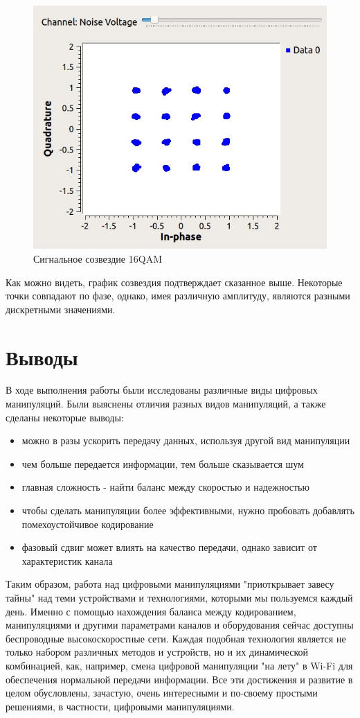 	\begin{figure}[H]
		\begin{center}
			\includegraphics[scale=0.4]{../16qam.jpg}
			\caption{Сигнальное созвездие 16QAM} 
		\end{center}
	\end{figure}
	Как можно видеть, график созвездия подтверждает сказанное выше. Некоторые точки совпадают по фазе, однако, имея различную амплитуду, являются разными дискретными значениями. 
	
	\newpage
	\section{Выводы}
	В ходе выполнения работы были исследованы различные виды цифровых манипуляций. Были выяснены отличия разных видов манипуляций, а также сделаны некоторые выводы:
	\begin{itemize}
		\item можно в разы ускорить передачу данных, используя другой вид манипуляции
		\item чем больше передается информации, тем больше сказывается шум
		\item главная сложность - найти баланс между скоростью и надежностью
		\item чтобы сделать манипуляции более эффективными, нужно пробовать добавлять помехоустойчивое кодирование
		\item фазовый сдвиг может влиять на качество передачи, однако зависит от характеристик канала
	\end{itemize}
	Таким образом, работа над цифровыми манипуляциями "приоткрывает завесу тайны" над теми устройствами и технологиями, которыми мы пользуемся каждый день. Именно с помощью нахождения баланса между кодированием, манипуляциями и другими параметрами каналов и оборудования сейчас доступны беспроводные высокоскоростные сети. Каждая подобная технология является не только набором различных методов и устройств, но и их динамической комбинацией, как, например, смена цифровой манипуляции "на лету" в Wi-Fi для обеспечения нормальной передачи информации. Все эти достижения и развитие в целом обусловлены, зачастую, очень интересными и по-своему простыми решениями, в частности, цифровыми манипуляциями.
